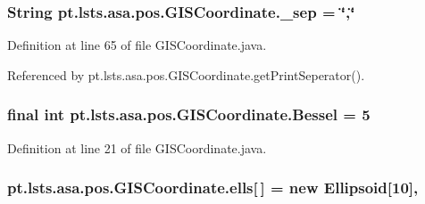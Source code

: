 \hypertarget{classpt_1_1lsts_1_1asa_1_1pos_1_1GISCoordinate_a2fdaf8f95cf0cbfc186618d2d29a3ab0}{}
\subsubsection[{\+\_\+sep}]{\setlength{\rightskip}{0pt plus 5cm}String pt.\+lsts.\+asa.\+pos.\+G\+I\+S\+Coordinate.\+\_\+sep = \char`\"{},\char`\"{}\hspace{0.3cm}{\ttfamily [private]}}\label{classpt_1_1lsts_1_1asa_1_1pos_1_1GISCoordinate_a2fdaf8f95cf0cbfc186618d2d29a3ab0}


Definition at line 65 of file G\+I\+S\+Coordinate.\+java.



Referenced by pt.\+lsts.\+asa.\+pos.\+G\+I\+S\+Coordinate.\+get\+Print\+Seperator().

\hypertarget{classpt_1_1lsts_1_1asa_1_1pos_1_1GISCoordinate_a84f793fffc95437d28e1085618e22458}{}
\subsubsection[{Bessel}]{\setlength{\rightskip}{0pt plus 5cm}final int pt.\+lsts.\+asa.\+pos.\+G\+I\+S\+Coordinate.\+Bessel = 5\hspace{0.3cm}{\ttfamily [static]}}\label{classpt_1_1lsts_1_1asa_1_1pos_1_1GISCoordinate_a84f793fffc95437d28e1085618e22458}


Definition at line 21 of file G\+I\+S\+Coordinate.\+java.

\hypertarget{classpt_1_1lsts_1_1asa_1_1pos_1_1GISCoordinate_a6a478421d6fe844b6b84d3413664888e}{}
\subsubsection[{ells}]{ pt.\+lsts.\+asa.\+pos.\+G\+I\+S\+Coordinate.\+ells\mbox{[}$\,$\mbox{]} = new {\bf Ellipsoid}\mbox{[}10\mbox{]}\hspace{0.3cm}{\ttfamily [static]}, {\ttfamily [private]}}\label{classpt_1_1lsts_1_1asa_1_1pos_1_1GISCoordinate_a6a478421d6fe844b6b84d3413664888e}


